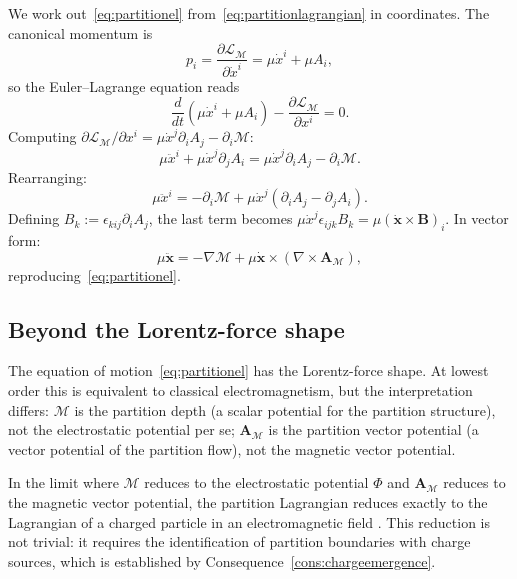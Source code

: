 \documentclass[11pt,twocolumn,a4paper]{article}
\theoremstyle{axiomstyle}
\theoremstyle{conseqstyle}
\theoremstyle{definition}
\theoremstyle{remark}
\newcommand{\Depth}{\mathcal{M}}
\newcommand{\Apartition}{\bm{A}_{\Depth}}
\newcommand{\Lagr}{\mathcal{L}}
\begin{document}
We work out~\eqref{eq:partitionel} from~\eqref{eq:partitionlagrangian} in coordinates. The canonical momentum is
\begin{equation*}
p_{i}=\frac{\partial\Lagr_{\Depth}}{\partial\dot{x}^{i}}=\mu\dot{x}^{i}+\mu A_{i},
\end{equation*}
so the Euler--Lagrange equation reads
\begin{equation*}
\frac{d}{dt}(\mu\dot{x}^{i}+\mu A_{i})-\frac{\partial\Lagr_{\Depth}}{\partial x^{i}}=0.
\end{equation*}
Computing $\partial\Lagr_{\Depth}/\partial x^{i}=\mu\dot{x}^{j}\partial_{i}A_{j}-\partial_{i}\Depth$:
\begin{equation*}
\mu\ddot{x}^{i}+\mu\dot{x}^{j}\partial_{j}A_{i}=\mu\dot{x}^{j}\partial_{i}A_{j}-\partial_{i}\Depth.
\end{equation*}
Rearranging:
\begin{equation*}
\mu\ddot{x}^{i}=-\partial_{i}\Depth+\mu\dot{x}^{j}(\partial_{i}A_{j}-\partial_{j}A_{i}).
\end{equation*}
Defining $B_{k}:=\epsilon_{kij}\partial_{i}A_{j}$, the last term becomes $\mu\dot{x}^{j}\epsilon_{ijk}B_{k}=\mu(\dot{\mathbf{x}}\times\mathbf{B})_{i}$. In vector form:
\begin{equation}
\mu\ddot{\mathbf{x}}=-\nabla\Depth+\mu\dot{\mathbf{x}}\times(\nabla\times\Apartition),
\end{equation}
reproducing~\eqref{eq:partitionel}.

\subsection{Beyond the Lorentz-force shape}

The equation of motion~\eqref{eq:partitionel} has the Lorentz-force shape. At lowest order this is equivalent to classical electromagnetism, but the interpretation differs: $\Depth$ is the partition depth (a scalar potential for the partition structure), not the electrostatic potential per se; $\Apartition$ is the partition vector potential (a vector potential of the partition flow), not the magnetic vector potential.

In the limit where $\Depth$ reduces to the electrostatic potential $\Phi$ and $\Apartition$ reduces to the magnetic vector potential, the partition Lagrangian reduces exactly to the Lagrangian of a charged particle in an electromagnetic field \citep[Ch. 3]{landaulifshitz1}. This reduction is not trivial: it requires the identification of partition boundaries with charge sources, which is established by Consequence~\ref{cons:chargeemergence}.
\end{document}
